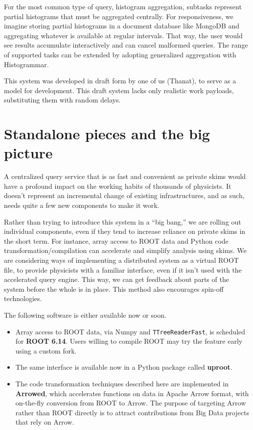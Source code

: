 \documentclass[a4paper]{jpconf}
\begin{document}
For the most common type of query, histogram aggregation, subtasks represent partial histograms that must be aggregated centrally. For responsiveness, we imagine storing partial histograms in a document database like MongoDB and aggregating whatever is available at regular intervals. That way, the user would see results accumulate interactively and can cancel malformed queries. The range of supported tasks can be extended by adopting generalized aggregation with Histogrammar\cite{histogrammar}.

This system was developed in draft form by one of us (Thanat)\cite{thanat}, to serve as a model for development. This draft system lacks only realistic work payloads, substituting them with random delays.

\section{Standalone pieces and the big picture}

A centralized query service that is as fast and convenient as private skims would have a profound impact on the working habits of thousands of physicists. It doesn't represent an incremental change of existing infrastructures, and as such, needs quite a few new components to make it work.

Rather than trying to introduce this system in a ``big bang,'' we are rolling out individual components, even if they tend to increase reliance on private skims in the short term. For instance, array access to ROOT data and Python code transformation/compilation can accelerate and simplify analysis using skims. We are considering ways of implementing a distributed system as a virtual ROOT file, to provide physicists with a familiar interface, even if it isn't used with the accelerated query engine. This way, we can get feedback about parts of the system before the whole is in place. This method also encourages spin-off technologies.

The following software is either available now or soon.
\begin{itemize}
\item Array access to ROOT data, via Numpy and {\tt TTreeReaderFast}, is scheduled for {\bf ROOT 6.14}\cite{root}. Users willing to compile ROOT may try the feature early using a custom fork\cite{root-brian}.
\item The same interface is available now in a Python package called {\bf uproot}\cite{uproot}.
\item The code transformation techniques described here are implemented in {\bf Arrowed}\cite{arrowed}, which accelerates functions on data in Apache Arrow\cite{arrow} format, with on-the-fly conversion from ROOT to Arrow. The purpose of targeting Arrow rather than ROOT directly is to attract contributions from Big Data projects that rely on Arrow.
\end{itemize}
\end{document}
